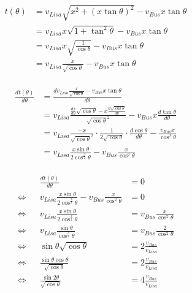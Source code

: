 \documentclass[10pt]{article}
\begin{document}
\newcommand{\vb}{v_{Bus}}
\newcommand{\vl}{v_{Lisa}}
\newcommand{\te}{t(\theta)}
\newcommand{\dt}[1]{\frac{d#1}{d\theta}}
\newcommand{\dte}{\dt{\te}}

\newcommand{\x}{x}

\renewcommand{\a}{a}
\renewcommand{\b}{b}
\renewcommand{\c}{c}

\newcommand{\f}{f}

\newcommand{\tf}{t(\f)}
\newcommand{\df}[1]{\frac{d#1}{d\f}}
\newcommand{\dtf}{\dt{\tf}}

\newcommand{\abs}[1]{\lvert #1 \rvert}

\begin{align*}
\te &= \vl\sqrt{\x^2+(\x\tan\theta)^2}-\vb\x\tan\theta\\
&= \vl\x\sqrt{1+\tan^2\theta}-\vb\x\tan\theta\\
&= \vl\x\sqrt{\frac{1}{\cos\theta}}-\vb\x\tan\theta\\
&= \vl\frac{\x}{\sqrt{\cos\theta}}-\vb\x\tan\theta\\
\end{align*}

\begin{align*}
\dte &= \dt{\vl\frac{\x}{\sqrt{\cos\theta}}-\vb\x\tan\theta}\\
&=\vl\frac{\dt{\x}\sqrt{\cos\theta}-\x\dt{\sqrt{\cos\theta}}}{\sqrt{\cos\theta}^2}-\vb\x\dt{\tan\theta}\\
&=\vl\frac{-\x}{\sqrt{\cos\theta}^2}\cdot\frac{1}{2\sqrt{\cos\theta}}\cdot\dt{\cos\theta}-\frac{\vb\x}{\cos^2\theta}\\
&=\vl\frac{\x\sin\theta}{2\cos^{\frac{3}{2}}\theta}-\vb\frac{\x}{\cos^2\theta}\\
\end{align*}

\begin{align*}
&&\dte &= 0\\
\iff&&\vl\frac{\x\sin\theta}{2\cos^{\frac{3}{2}}\theta}-\vb\frac{\x}{\cos^2\theta} &= 0\\
\iff&&\vl\frac{\x\sin\theta}{2\cos^{\frac{3}{2}}\theta} &= \vb\frac{\x}{\cos^2\theta}\\
\iff&&\vl\frac{\sin\theta}{\cos^{\frac{3}{2}}\theta} &= \vb\frac{2}{\cos^2\theta}\\
\iff&&\sin\theta\sqrt{\cos\theta} &= 2\frac{\vb}{\vl}\\
\iff&&\frac{\sin\theta\cos\theta}{\sqrt{\cos\theta}} &= 2\frac{\vb}{\vl}\\
\iff&&\frac{\sin2\theta}{\sqrt{\cos\theta}} &= 4\frac{\vb}{\vl}\\
\end{align*}
\end{document}
